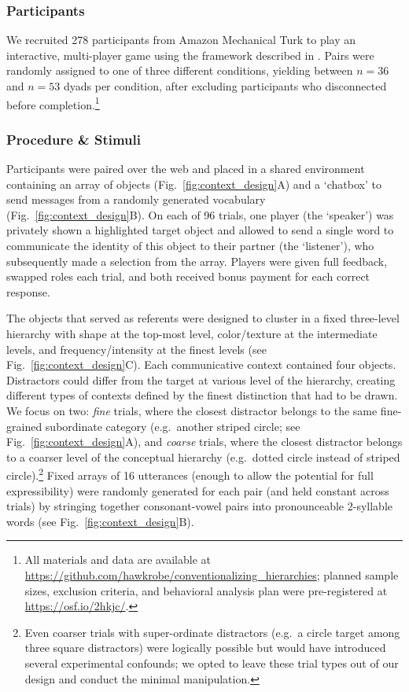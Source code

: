 \subsubsection{Participants}

We recruited 278 participants from Amazon Mechanical Turk to play an interactive, multi-player game using the framework described in . Pairs were randomly assigned to one of three different conditions, yielding between $n=36$ and $n=53$ dyads per condition, after excluding participants who disconnected before completion.\footnote{All materials and data are available at \url{https://github.com/hawkrobe/conventionalizing_hierarchies}; planned sample sizes, exclusion criteria, and behavioral analysis plan were pre-registered at \url{https://osf.io/2hkjc/}.}

\subsubsection{Procedure \& Stimuli}
Participants were paired over the web and placed in a shared environment containing an array of objects (Fig.\ \ref{fig:context_design}A) and a `chatbox' to send messages from a randomly generated vocabulary (Fig.\ \ref{fig:context_design}B). On each of 96 trials, one player (the `speaker') was privately shown a highlighted target object and allowed to send a single word to communicate the identity of this object to their partner (the `listener'), who subsequently made a selection from the array. Players were given full feedback, swapped roles each trial, and both received bonus payment for each correct response.

The objects that served as referents were designed to cluster in a fixed three-level hierarchy with shape at the top-most level, color/texture at the intermediate levels, and frequency/intensity at the finest levels (see Fig.\ \ref{fig:context_design}C). Each communicative context contained four objects. Distractors could differ from the target at various level of the hierarchy, creating different types of contexts defined by the finest distinction that had to be drawn. We focus on two: \emph{fine} trials, where the closest distractor belongs to the same fine-grained subordinate category (e.g.\ another striped circle; see Fig.\ \ref{fig:context_design}A), and \emph{coarse} trials, where the closest distractor belongs to a coarser level of the conceptual hierarchy (e.g.\ dotted circle instead of striped circle).\footnote{Even coarser trials with super-ordinate distractors (e.g.\ a circle target among three square distractors) were logically possible but would have introduced several experimental confounds; we opted to leave these trial types out of our design and conduct the minimal manipulation.} Fixed arrays of 16 utterances (enough to allow the potential for full expressibility) were randomly generated for each pair (and held constant across trials) by stringing together consonant-vowel pairs into pronounceable 2-syllable words (see Fig.\ \ref{fig:context_design}B).

